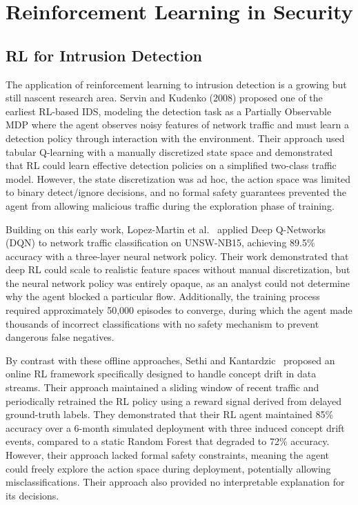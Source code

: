 \documentclass[12pt, letterpaper, oneside]{report}
\begin{document}
\section{Reinforcement Learning in Security}
\label{sec:lit_rl}

\subsection{RL for Intrusion Detection}

The application of reinforcement learning to intrusion detection is a growing but still nascent research area. Servin and Kudenko (2008) proposed one of the earliest RL-based IDS, modeling the detection task as a Partially Observable MDP where the agent observes noisy features of network traffic and must learn a detection policy through interaction with the environment. Their approach used tabular Q-learning with a manually discretized state space and demonstrated that RL could learn effective detection policies on a simplified two-class traffic model. However, the state discretization was ad hoc, the action space was limited to binary detect/ignore decisions, and no formal safety guarantees prevented the agent from allowing malicious traffic during the exploration phase of training.

Building on this early work, Lopez-Martin et al.~\cite{lopez2020} applied Deep Q-Networks (DQN) to network traffic classification on UNSW-NB15, achieving 89.5\% accuracy with a three-layer neural network policy. Their work demonstrated that deep RL could scale to realistic feature spaces without manual discretization, but the neural network policy was entirely opaque, as an analyst could not determine why the agent blocked a particular flow. Additionally, the training process required approximately 50,000 episodes to converge, during which the agent made thousands of incorrect classifications with no safety mechanism to prevent dangerous false negatives.

By contrast with these offline approaches, Sethi and Kantardzic~\cite{sethi2018} proposed an online RL framework specifically designed to handle concept drift in data streams. Their approach maintained a sliding window of recent traffic and periodically retrained the RL policy using a reward signal derived from delayed ground-truth labels. They demonstrated that their RL agent maintained 85\% accuracy over a 6-month simulated deployment with three induced concept drift events, compared to a static Random Forest that degraded to 72\% accuracy. However, their approach lacked formal safety constraints, meaning the agent could freely explore the action space during deployment, potentially allowing misclassifications. Their approach also provided no interpretable explanation for its decisions.
\end{document}
